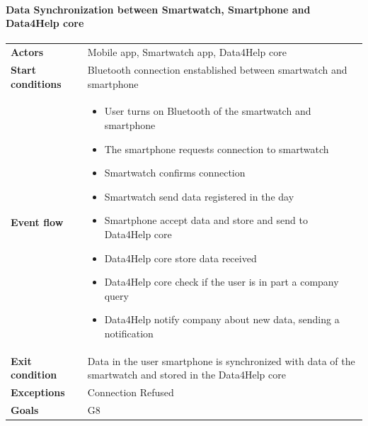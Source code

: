 \paragraph{Data Synchronization between Smartwatch, Smartphone and Data4Help core}
\begin{center}
\begin{table}[H]
\centering
\begin{tabular}{l|p{}}
\textbf{Actors} & 
Mobile app, Smartwatch app, Data4Help core \\
\textbf{Start conditions} & Bluetooth connection enstablished between smartwatch and smartphone \\
\textbf{Event flow}  & \begin{minipage}[t]{0.7\textwidth}
    \begin{itemize}
        \item User turns on Bluetooth of the smartwatch and smartphone

        \item The smartphone requests connection to smartwatch

        \item Smartwatch confirms connection
        \item Smartwatch send data registered in the day 
        \item Smartphone accept data and store and send to Data4Help core
        \item Data4Help core store data received
        \item Data4Help core check if the user is in part a company query
        \item Data4Help notify company about  new data, sending a notification
        

    \end{itemize}
    
\end{minipage}\\
\textbf{Exit condition} & Data in the user smartphone is synchronized with data of the smartwatch and stored in the Data4Help core \\
\textbf{Exceptions} & Connection Refused \\
\textbf{Goals} & G8
\end{tabular}

\end{table}
\end{center}


